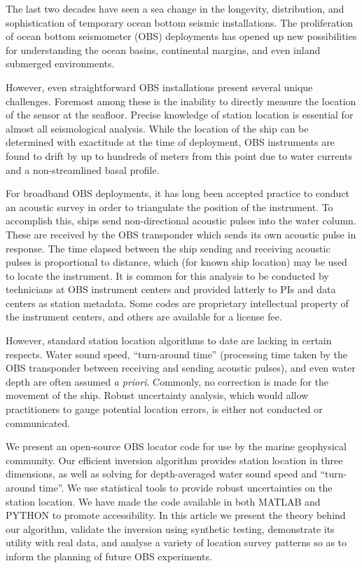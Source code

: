 The last two decades have seen a sea change in the longevity, distribution, and sophistication of temporary ocean bottom seismic installations. The proliferation of ocean bottom seismometer (OBS) deployments has opened up new possibilities for understanding the ocean basins, continental margins, and even inland submerged environments. 

However, even straightforward OBS installations present several unique challenges. Foremost among these is the inability to directly measure the location of the sensor at the seafloor. Precise knowledge of station location is essential for almost all seismological analysis. While the location of the ship can be determined with exactitude at the time of deployment, OBS instruments are found to drift by up to hundreds of meters from this point due to water currents and a non-streamlined  basal profile. 

For broadband OBS deployments, it has long been accepted practice to conduct an acoustic survey in order to triangulate the position of the instrument. To accomplish this, ships send non-directional acoustic pulses into the water column. These are received by the OBS transponder which sends its own acoustic pulse in response. The time elapsed between the ship sending and receiving acoustic pulses is proportional to distance, which (for known ship location) may be used to locate the instrument. It is common for this analysis to be conducted by technicians at OBS instrument centers and provided latterly to PIs and data centers as station metadata. Some codes are proprietary intellectual property of the instrument centers, and others are available for a license fee. 

However, standard station location algorithms to date are lacking in certain respects. Water sound speed, ``turn-around time'' (processing time taken by the OBS transponder between receiving and sending acoustic pulses), and even water depth are often assumed \textit{a priori}. Commonly, no correction is made for the movement of the ship. Robust uncertainty analysis, which would allow practitioners to gauge potential location errors, is either not conducted or communicated. 

We present an open-source OBS locator code for use by the marine geophysical community. Our efficient inversion algorithm provides station location in three dimensions, as well as solving for depth-averaged water sound speed and ``turn-around time''. We use statistical tools to provide robust uncertainties on the station location. We have made the code available in both MATLAB and PYTHON to promote accessibility. In this article we present the theory behind our algorithm, validate the inversion using synthetic testing, demonstrate its utility with real data, and analyse a variety of location survey patterns so as to inform the planning of future OBS experiments. 